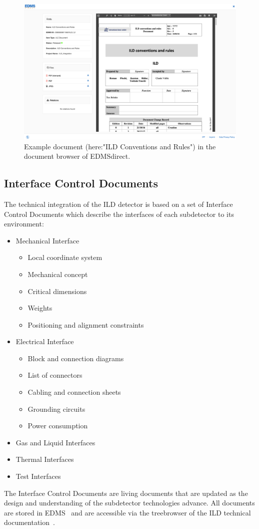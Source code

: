 \begin{figure}[h!]
\centering
\includegraphics[width=0.8\hsize]{Integration/fig/EDMS_direct_document.png}

\caption{\label{ild:fig:integration:edmsdirect_document}Example document (here:"ILD Conventions and Rules") in the document browser of EDMSdirect.}
\end{figure}

\subsection{Interface Control Documents}
The technical integration of the ILD detector is based on a set of Interface Control Documents which describe the interfaces of each subdetector to its environment:
\begin{itemize}
    \item Mechanical Interface
    \begin{itemize}
        \item Local coordinate system
        \item Mechanical concept
        \item Critical dimensions
        \item Weights
        \item Positioning and alignment constraints
    \end{itemize}
    \item Electrical Interface
    \begin{itemize}
        \item Block and connection diagrams
        \item List of connectors
        \item Cabling and connection sheets
        \item Grounding circuits
        \item Power consumption
    \end{itemize}
    \item Gas and Liquid Interfaces
    \item Thermal Interfaces
    \item Test Interfaces
\end{itemize}
The Interface Control Documents are living documents that are updated as the design and understanding of the subdetector technologies advance. All documents are stored in EDMS~\cite{ild:bib:edms} and are accessible via the treebrowser of the ILD technical documentation~\cite{ild:bib:edmsdirect}.

